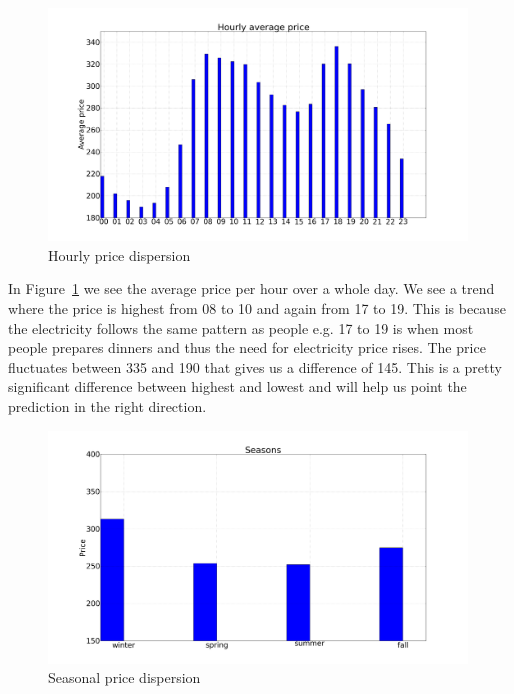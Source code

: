 \begin{figure}[H]
\centering
\includegraphics[width=0.99\textwidth ]{billeder/energy_price_plots/price_per_hour.png}
\caption{Hourly price dispersion}
\label{fig:price_per_hour}
\end{figure}

In Figure~\ref{fig:price_per_hour} we see the average price per hour over a whole day. We see a trend where the price is highest from 08 to 10 and again from 17 to 19. This is because the electricity follows the same pattern as people e.g. 17 to 19 is when most people prepares dinners and thus the need for electricity price rises. The price fluctuates between 335 and 190 that gives us a difference of 145. This is a pretty significant difference between highest and lowest and will help us point the prediction in the right direction.

\begin{figure}[H]
\centering
\includegraphics[width=0.99\textwidth ]{billeder/energy_price_plots/seasons.png}
\caption{Seasonal price dispersion}
\label{fig:seasons}
\end{figure}

